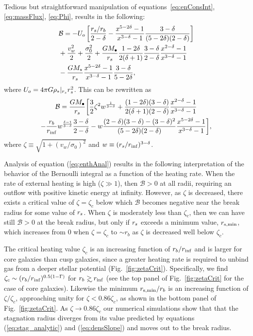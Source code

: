 Tedious but straightforward manipulation of equations~\eqref{eq:enConsInt}, \eqref{eq:massFlux}, \eqref{eq:Phi}, results in the following:
\begin{align}
  &\mathcal{B} = -U_o\left[\frac{r_s/r_b}{2-\delta}-\frac{x^{5-2\delta}-1}{x^{3-\delta}-1}\frac{3-\delta}{(5-2\delta)(2-\delta)}\right]\nonumber\\
  &+\frac{v_w^2}{2}+\frac{\sigma_0^2}{2}+ \frac{G M_{\bullet}}{r_s}
  \frac{1-2\delta}{2(\delta+1)}
  \frac{3-\delta}{2-\delta}\frac{x^{2-\delta}-1}{x^{3-\delta}-1}
  \nonumber\\
  &-\frac{G M_\star}{r_s}
  \frac{x^{5-2\delta}-1}{x^{3-\delta}-1}\frac{3-\delta}{5-2\delta},
\end{align}
where $U_o=4 \pi G \rho_*|_{r_s} r_s^2$.  This can be rewritten as
\begin{multline}
  \mathcal{B} =\frac{G M_{\bullet}}{r_s} \biggl[ \frac{3}{2} \zeta^2
  w^{\frac{1}{3 -\delta}}
  +\frac{(1-2\delta)(3-\delta)}{2(\delta+1)(2-\delta)}  \frac{x^{2  -\delta}-1}{x^{3-\delta}-1}\\
  -\frac{r_b}{r_{\rm inf}} w^{\frac{\delta-1}{3-\delta}} \frac{3 -\delta}{2
    -\delta} -w
  \frac{(2-\delta)(3-\delta)-(3-\delta)^{2}}{(5-2\delta)(2-\delta)}
  \frac{x^{5-2\delta}-1}{x^{3-\delta}-1} \biggr],
\label{eq:enthAnal}
\end{multline}
where $\zeta \equiv \sqrt{1 + (v_w/\sigma_0)^2}$ and $w\equiv
(r_s/r_{\rm inf})^{3-\delta}$.

Analysis of equation (\ref{eq:enthAnal}) results in the following
interpretation of the behavior of the Bernoulli integral as a function
of the heating rate.  When the rate of external heating is high
($\zeta \gg 1$), then $\mathcal{B} > 0$ at all radii, requiring an
outflow with positive kinetic energy at infinity.  However, as $\zeta$
is decreased, there exists a critical value of $\zeta = \zeta_{c}$
below which $\mathcal{B}$ becomes negative near the break radius for
some value of $r_s$.  When $\zeta$ is moderately less than $\zeta_c$,
then we can have still $\mathcal{B} > 0$ at the break radius, but only
if $r_s$ exceeds a minimum value, $r_{\rm s,min}$, which increases
from 0 when $\zeta = \zeta_c$ to $\sim r_{b}$ as $\zeta$ is decreased
well below $\zeta_c$.

The critical heating value $\zeta_c$ is an increasing function of
$r_{b}/r_{\rm inf}$ and is larger for core galaxies than cusp
galaxies, since a greater heating rate is required to unbind gas from
a deeper stellar potential (Fig.~\ref{fig:zetaCrit}).  Specifically,
we find $\zeta_c\sim (r_b/r_{\rm inf})^{0.5(1-\Gamma)}$ for $\rb\gsim\rinf$
(see the top panel of Fig.~\ref{fig:zetaCrit} for the case of core
galaxies). Likewise the minimum $r_{\rm s,min}/r_{b}$ is an increasing
function of $\zeta/\zeta_{c}$, approaching unity for $\zeta <
0.86\zeta_c$, as shown in the bottom panel of Fig.~\ref{fig:zetaCrit}.
As $\zeta \rightarrow 0.86\zeta_c$ our numerical simulations show that
that the stagnation radius diverges from its value predicted by
equations (\ref{eq:stag_analytic}) and (\ref{eq:densSlope}) and moves
out to the break radius.


